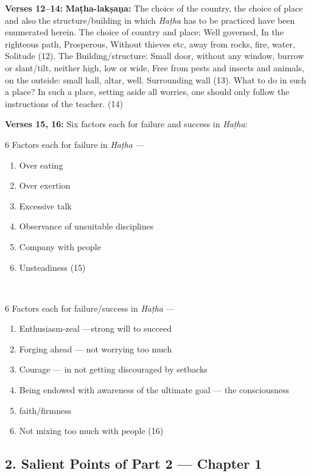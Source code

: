 \textbf{Verses 12--14:} \textbf{Maṭha-lakṣaṇa:} The choice of the country, the choice of place and also the structure/building in which \textit{Haṭha} has to be practiced have been enumerated herein.  The choice of country and place: Well governed, In the righteous path, Prosperous, Without thieves etc, away from rocks, fire, water, Solitude (12). The Building/structure: Small door, without any window, burrow or slant/tilt, neither high, low or wide, Free from pests and insects and animals, on the outside: small hall, altar, well. Surrounding wall (13). What to do in such a place?  In such a place, setting aside all worries, one should only follow the instructions of the teacher. (14)

\newpage

\textbf{Verses 15, 16:} Six factors each for failure and success in \textit{Haṭha}: 

\noindent
\begin{minipage}[t]{.45\linewidth}
6 Factors each for failure in \textit{Haṭha} ---
\begin{enumerate}
\item Over eating 
\item Over exertion 
\item Excessive talk
\item Observance of unsuitable disciplines 
\item Company with people 
\item Unsteadiness  (15)
\end{enumerate}
\end{minipage}
\smallskip~
\begin{minipage}[t]{.45\linewidth}
6 Factors each for failure/success in \textit{Haṭha} ---
\begin{enumerate}
\item Enthusiasm-zeal ---\hfil\break  strong will to succeed 
\item Forging ahead --- not worrying too much 
\item Courage --- in not getting discouraged by setbacks
\item Being  endowed with awareness of the ultimate goal --- the consciousness  
\item faith/firmness 
\item Not mixing too much with people (16) 
\end{enumerate}
\end{minipage}

\subsection*{2. Salient Points of Part 2 --- Chapter 1}

